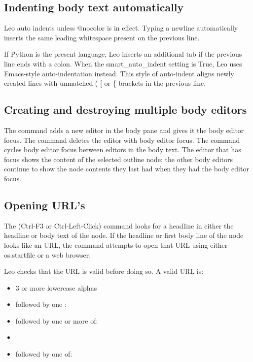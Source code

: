 \documentclass[a4paper,10pt,english]{sphinxmanual}
\begin{document}
\subsection{Indenting body text automatically}
\label{commands:indenting-body-text-automatically}
Leo auto indents unless @nocolor is in effect.  Typing a newline
automatically inserts the same leading whitespace present on the previous line.

If Python is the present language, Leo inserts an additional tab if the previous
line ends with a colon.  When the smart\_auto\_indent setting is True, Leo uses Emacs-style
auto-indentation instead.  This style of auto-indent aligns newly created lines
with unmatched ( {[} or \{ brackets in the previous line.


\subsection{Creating and destroying multiple body editors}
\label{commands:creating-and-destroying-multiple-body-editors}
The  command adds a new editor in the body pane and gives it
the body editor focus. The  command deletes the editor
with body editor focus. The  command cycles body
editor focus between editors in the body text. The editor that has focus
shows the content of the selected outline node; the other body editors
continue to show the node contents they last had when they had the body
editor focus.


\subsection{Opening URL's}
\label{commands:opening-url-s}
The  (Ctrl-F3 or Ctrl-Left-Click) command looks for a headline
in either the headline or body text of the node. If the headline or first
body line of the node looks like an URL, the  command attempts
to open that URL using either os.startfile or a web browser.

Leo checks that the URL is valid before doing so. A valid URL is:
\begin{itemize}
\item {} 
3 or more lowercase alphas

\item {} 
followed by one :

\item {} 
followed by one or more of:

\item {} 

\item {} 
followed by one of: 

\end{itemize}
\end{document}
